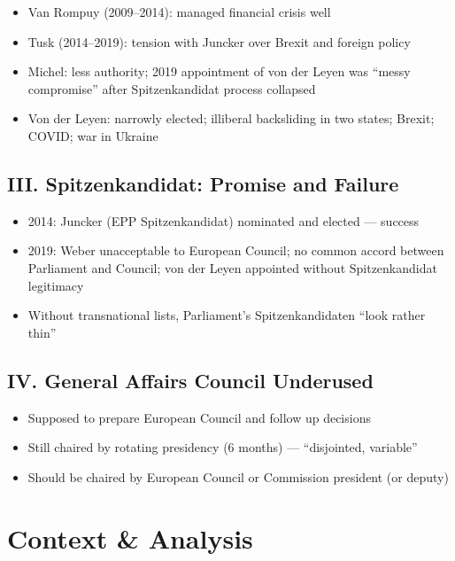 \documentclass[11pt,a4paper]{article}
\begin{document}
\begin{itemize}
\item Van Rompuy (2009--2014): managed financial crisis well
\item Tusk (2014--2019): tension with Juncker over Brexit and foreign policy
\item Michel: less authority; 2019 appointment of von der Leyen was ``messy compromise'' after Spitzenkandidat process collapsed
\item Von der Leyen: narrowly elected; illiberal backsliding in two states; Brexit; COVID; war in Ukraine
\end{itemize}

\subsection*{III. Spitzenkandidat: Promise and Failure}

\begin{itemize}
\item 2014: Juncker (EPP Spitzenkandidat) nominated and elected --- success
\item 2019: Weber unacceptable to European Council; no common accord between Parliament and Council; von der Leyen appointed without Spitzenkandidat legitimacy
\item Without transnational lists, Parliament's Spitzenkandidaten ``look rather thin''
\end{itemize}

\subsection*{IV. General Affairs Council Underused}

\begin{itemize}
\item Supposed to prepare European Council and follow up decisions
\item Still chaired by rotating presidency (6 months) --- ``disjointed, variable''
\item Should be chaired by European Council or Commission president (or deputy)
\end{itemize}

\section*{Context \& Analysis}
\end{document}
